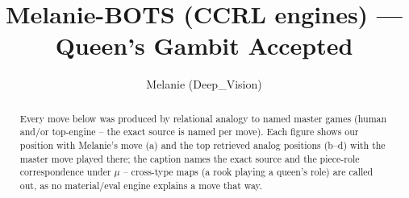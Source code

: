 \documentclass[11pt]{article}
\title{Melanie-BOTS (CCRL engines) — Queen's Gambit Accepted}
\author{Melanie (Deep\_Vision)}
\date{}
\begin{document}
\maketitle

\begin{abstract}Every move below was produced by relational analogy to named master games (human and/or top-engine -- the exact source is named per move). Each figure shows our position with Melanie's move (a) and the top retrieved analog positions (b--d) with the master move played there; the caption names the exact source and the piece-role correspondence under $\mu$ -- cross-type maps (a rook playing a queen's role) are called out, as no material/eval engine explains a move that way.\end{abstract}

\begin{figure}[p]\centering
\begin{subfigure}{0.46\textwidth}\centering
\resizebox{\linewidth}{!}{%
\newchessgame
\chessboard[
  setfen={rnbqkb1r/1p3ppp/p3pn2/2p5/2BP4/4PN2/PP3PPP/RNBQ1RK1 w kq - 0 7},
  showmover=false,
  pgfstyle=straightmove, color=movearrow, markmove={a2-a4}
]}
\caption{}
\end{subfigure}\hfill
\begin{subfigure}{0.46\textwidth}\centering
\resizebox{\linewidth}{!}{%
\newchessgame
\chessboard[
  setfen={rnbqkb1r/1p3ppp/p3pn2/2p5/2BP4/4PN2/PP3PPP/RNBQ1RK1 w kq - 0 7},
  showmover=false,
  pgfstyle=straightmove, color=movearrow, markmove={a2-a4}
]}
\caption{}
\end{subfigure}
\\[4pt]
\begin{subfigure}{0.46\textwidth}\centering
\resizebox{\linewidth}{!}{%
\newchessgame
\chessboard[
  setfen={rnbqkb1r/1p3ppp/p3pn2/2p5/2BP4/4PN2/PP3PPP/RNBQ1RK1 w kq - 0 7},
  showmover=false,
  pgfstyle=straightmove, color=movearrow, markmove={a2-a4}
]}
\caption{}
\end{subfigure}\hfill
\begin{subfigure}{0.46\textwidth}\centering
\resizebox{\linewidth}{!}{%
\newchessgame
\chessboard[
  setfen={rnbqkb1r/1p3ppp/p3pn2/2p5/2BP4/4PN2/PP3PPP/RNBQ1RK1 w kq - 0 7},
  showmover=false,
  pgfstyle=straightmove, color=movearrow, markmove={a2-a4}
]}
\caption{}
\end{subfigure}

\end{figure}
\end{document}
